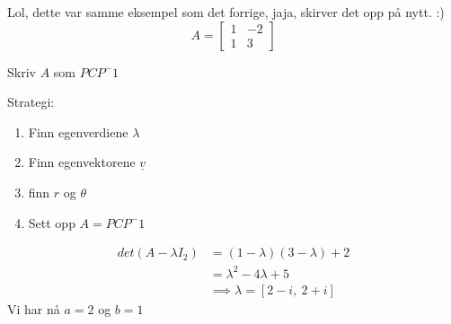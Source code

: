 \documentclass[11pt, a4paper, norsk]{article}
\begin{document}
        \begin{Example}{}{}
            Lol, dette var samme eksempel som det forrige, jaja, skirver det opp på nytt. :)
            $$
                A = \begin{bmatrix}
                    1 & -2 \\
                    1 & 3
                \end{bmatrix}
            $$

            Skriv $A$ som $PCP^-1$
            
            Strategi:
            \begin{enumerate}
                \item Finn egenverdiene $\lambda$
                \item Finn egenvektorene $\underline{v}$
                \item finn $r$ og $\theta$
                \item Sett opp $A = PCP^-1$
            \end{enumerate}

            \begin{align*}
                det(A - \lambda I_{2}) &= (1-\lambda)(3-\lambda)+2 \\
                                       &= \lambda^2 - 4\lambda + 5 \\
                                       &\implies \lambda = \left[ 2 - i, \  2 + i\right]
            \end{align*}
            Vi har nå $a=2$ og $b=1$
            

\end{Example}
\end{document}
